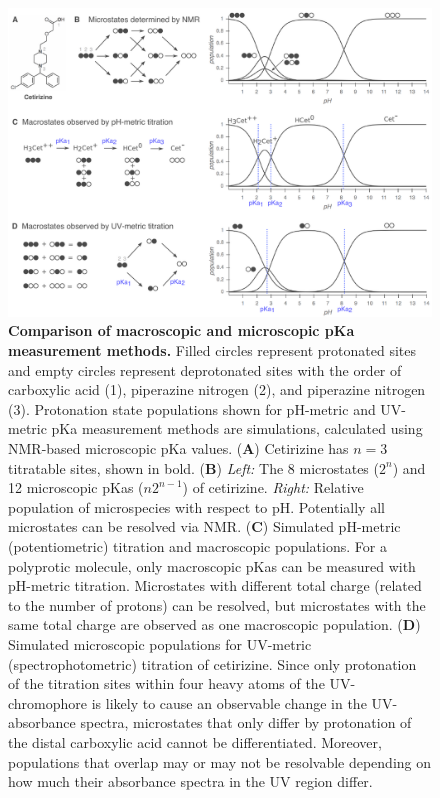 \documentclass[9pt,lineno]{elife}
\begin{document}
\begin{figure}
\begin{center}
\includegraphics[width=1.00\linewidth]{figures/microscopic_vs_macroscopic_populations_figure.pdf}
\caption{{\bf Comparison of macroscopic and microscopic pKa measurement methods.}  
Filled circles represent protonated sites and empty circles represent deprotonated sites with the order of carboxylic acid (1), piperazine nitrogen (2), and piperazine nitrogen (3). 
Protonation state populations shown for pH-metric and UV-metric pKa measurement methods are simulations, calculated using NMR-based microscopic pKa values.
(\textbf{A}) Cetirizine has $n = $3 titratable sites, shown in bold. 
(\textbf{B}) \emph{Left:} The 8 microstates ($2^n$) and 12 microscopic pKas ($n 2^{n-1}$) of cetirizine. 
\emph{Right:} Relative population of microspecies with respect to pH. 
Potentially all microstates can be resolved via NMR. 
(\textbf{C}) Simulated pH-metric (potentiometric) titration and macroscopic populations. 
For a polyprotic molecule, only macroscopic pKas can be measured with pH-metric titration. 
Microstates with different total charge (related to the number of protons) can be resolved, but microstates with the same total charge are observed as one macroscopic population. 
(\textbf{D}) Simulated microscopic populations for UV-metric (spectrophotometric) titration of cetirizine. 
Since only protonation of the titration sites within four heavy atoms of the UV-chromophore is likely to cause an observable change in the UV-absorbance spectra, microstates that only differ by protonation of the distal carboxylic acid cannot be differentiated. 
Moreover, populations that overlap may or may not be resolvable depending on how much their absorbance spectra in the UV region differ. 
}
\end{center}
\end{figure}
\end{document}
